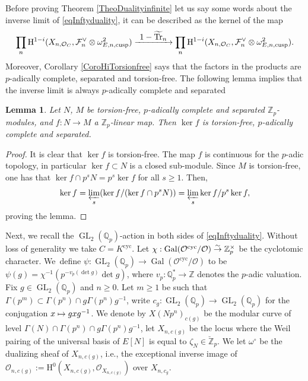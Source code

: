\documentclass[11pt]{article}
\newcommand{\ie}{i.e.,\xspace}
\newcommand\mto{\mathchoice{\longmapsto}{\mapsto}{\mapsto}{\mapsto}}
\newcommand\To[1]{\mathchoice{\xrightarrow{\textstyle\kern4pt#1\kern3pt}}{\stackrel{#1}{\to}}{}{}}
\newcommand{\cusp}{\mathrm{cusp}}
\newcommand{\cyc}{\mathrm{cyc}}
\numberwithin{equation}{section}
\newtheorem{lem}[prop]{Lemma}
\theoremstyle{definition}
\newcommand{\bb}[1]{\mathbb{#1}}
\newcommand{\n}[1]{\mathcal{#1}}
\newcommand{\s}[1]{\mathscr{#1}}
\DeclareMathOperator{\GL}{GL}
\DeclareMathOperator{\Tr}{Tr}
\DeclareMathOperator{\Gal}{Gal}
\begin{document}
Before proving Theorem \ref{TheoDualityinfinite} let us say some words about the inverse limit of \eqref{eqInftyduality}, it can be described as the kernel of the map
\[
\prod_{n} \mathrm{H}^{1-i}(X_{n,\n{O}_C}, \n{F}_n^{\vee} \otimes \omega^2_{E,n,\cusp}) \To{1- \widetilde{\Tr}_n} \prod_{n} \mathrm{H}^{1-i}(X_{n,\n{O}_C}, \n{F}_n^{\vee} \otimes \omega^2_{E,n,\cusp}).
\]
Moreover, Corollary \ref{CoroHiTorsionfree} says that the factors in the products are $p$-adically complete, separated and torsion-free. The following lemma implies that the inverse limit is always $p$-adically complete and separated

\begin{lem}
Let $N$, $M$ be torsion-free, $p$-adically complete and separated $\bb{Z}_p$\nobreakdash-mod\-ules, and $f:N \to M$ a $\bb{Z}_p$-linear map. Then $\ker f$ is torsion-free, $p$-adically complete and separated.
\end{lem}

\begin{proof}
It is clear that $\ker f$ is torsion-free. The map $f$ is continuous for the $p$-adic topology, in particular $\ker f \subset N$ is a closed sub-module. Since $M$ is torsion-free, one has that $\ker f\cap p^sN = p^s \ker f $ for all $s\geq 1$. Then,
\[
\ker f = \varprojlim_s (\ker f/ (\ker f\cap p^s N))= \varprojlim_s \ker f/p^s \ker f,
\]
proving the lemma.
\end{proof}

Next, we recall the $\GL_2(\bb{Q}_p)$-action in both sides of \eqref{eqInftyduality}. Without loss of generality we take $C=K^{\cyc}$. Let $ \chi: \Gal(\n{O}^{\cyc}/ \n{O}) \To{\sim} \bb{Z}_p^{\times} $ be the cyclotomic character. We~define $\psi: \GL_2(\bb{Q}_p)\to \Gal(\n{O}^{\cyc}/ \n{O})$ to be $\psi(g)= \chi^{-1} (p^{-v_p(\det g)} \det g)$, where $v_p: \bb{Q}_p^*\to \bb{Z}$ denotes the $p$-adic valuation. Fix $g\in \GL_2(\bb{Q}_p)$ and $n\geq 0$. Let $m\geq 1$ be such that $\Gamma(p^m)\subset \Gamma(p^n)\cap g \Gamma(p^n)g^{-1}$, write $c_g: \GL_2(\bb{Q}_p)\to \GL_2(\bb{Q}_p)$ for the conjugation $x\mto g x g^{-1}$. We denote by $X(Np^n)_{c(g)}$ be the modular curve of level $\Gamma(N)\cap \Gamma(p^n)\cap g \Gamma(p^n) g^{-1}$, let $X_{n,c(g)}$ be the locus where the Weil pairing of the universal basis of $E[N]$ is equal to $\zeta_N\in \breve{\bb{Z}}_p$. We let $\omega^{\circ}$ be the dualizing sheaf of $X_{n,c(g)}$, \ie the exceptional inverse image of $\n{O}_{n,c(g)}:= \mathrm{H}^0(X_{n,c(g)}, \s{O}_{X_{n,c(g)}})$ over $X_{n,c_{g}}$.
\end{document}

